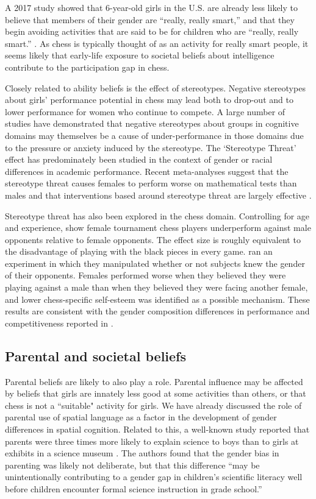 \documentclass[9pt,twocolumn,twoside,lineno]{pnas-new}
\begin{document}
A 2017 study showed that 6-year-old girls in the U.S. are already less likely to believe that members of their gender are “really, really smart,” and that they begin avoiding activities that are said to be for children who are “really, really smart.” \cite{bian2017gender}. As chess is typically thought of as an activity for really smart people, it seems likely that early-life exposure to societal beliefs about intelligence contribute to the participation gap in chess.

Closely related to ability beliefs is the effect of stereotypes. Negative stereotypes about girls' performance potential in chess may lead both to drop-out and to lower performance for women who  continue to compete. A large number of studies have demonstrated that negative stereotypes about groups in cognitive domains may themselves be a cause of under-performance in those domains due to the pressure or anxiety induced by the stereotype. The `Stereotype Threat' effect has predominately been studied in the context of gender or racial differences in academic performance. Recent meta-analyses suggest that the stereotype threat causes females to perform worse on mathematical tests than males \cite{picho2013} and that interventions based around stereotype threat are largely effective \cite{liu2020}.

Stereotype threat has also been explored in the chess domain. Controlling for age and experience, \cite{smerdon2020female} show female tournament chess players underperform against male opponents relative to female opponents. The effect size is roughly equivalent to the disadvantage of playing with the black pieces in every game. \citep{maass2008} ran an experiment in which they manipulated whether or not subjects knew the gender of their opponents. Females performed worse when they believed they were playing against a male than when they believed they were facing another female, and lower chess-specific self-esteem was identified as a possible mechanism. These results are consistent with the gender composition differences in performance and competitiveness reported in \cite{gneezy2003}.

\subsection*{Parental and societal beliefs}
Parental beliefs are likely to also play a role. Parental influence may be affected by beliefs that girls are innately less good at some activities than others, or that chess is not a ``suitable" activity for girls. We have already discussed the role of parental use of spatial language as a factor in the development of gender differences in spatial cognition. Related to this, a well-known study reported that parents were three times more likely to explain science to boys than to girls at exhibits in a science museum \cite{crowley2001}. The authors found that the gender bias in parenting was likely not deliberate, but that this difference ``may be unintentionally contributing to a gender gap in children’s scientific literacy well before children encounter formal science instruction in grade school.''
\end{document}
